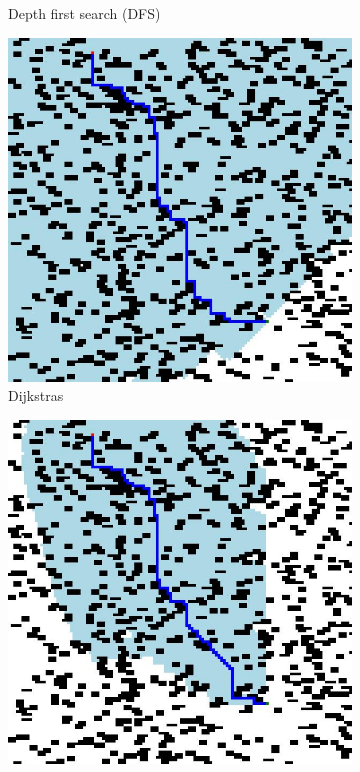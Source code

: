 \documentclass{article}
\begin{document}
\begin{figure}[H]
\begin{subfigure}{0.325\textwidth}
        \caption{Depth first search (DFS)}
    \end{subfigure}
    \begin{subfigure}{0.325\textwidth}
        \centering
        \includegraphics[width = \textwidth]{images/dijkstras.jpg}
        \caption{Dijkstras}
    \end{subfigure}
    \begin{subfigure}{0.325\textwidth}
        \centering
        \includegraphics[width = \textwidth]{images/astar.jpg}

\end{subfigure}
\end{figure}
\end{document}
